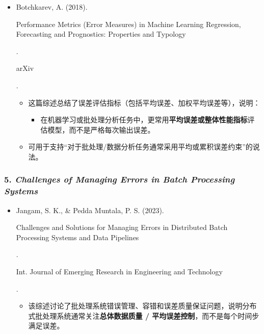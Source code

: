 \documentclass[
]{article}
\begin{document}
\begin{itemize}
\item
  Botchkarev, A. (2018).

  Performance Metrics (Error Measures) in Machine Learning Regression,
  Forecasting and Prognostics: Properties and Typology

  .

  arXiv

  .

  \begin{itemize}
  \item
    这篇综述总结了误差评估指标（包括平均误差、加权平均误差等），说明：

    \begin{itemize}
    \item
      在机器学习或批处理分析任务中，更常用\textbf{平均误差或整体性能指标}评估模型，而不是严格每次输出误差。
    \end{itemize}
  \item
    可用于支持``对于批处理/数据分析任务通常采用平均或累积误差约束''的说法。
  \end{itemize}
\end{itemize}

\subsubsection{\texorpdfstring{5. \emph{Challenges of Managing Errors in
Batch Processing
Systems}}{5. Challenges of Managing Errors in Batch Processing Systems}}\label{5-challenges-of-managing-errors-in-batch-processing-systems}

\begin{itemize}
\item
  Jangam, S. K., \& Pedda Muntala, P. S. (2023).

  Challenges and Solutions for Managing Errors in Distributed Batch
  Processing Systems and Data Pipelines

  .

  Int. Journal of Emerging Research in Engineering and Technology

  .

  \begin{itemize}
  \item
    该综述讨论了批处理系统错误管理、容错和误差质量保证问题，说明分布式批处理系统通常关注\textbf{总体数据质量
    / 平均误差控制}，而不是每个时间步满足误差。
  \end{itemize}
\end{itemize}
\end{document}
